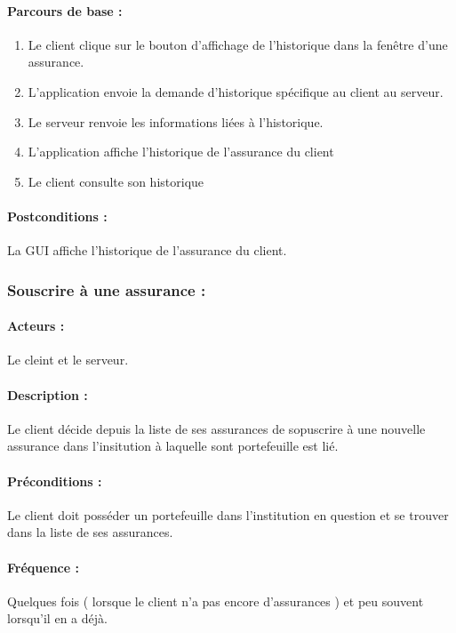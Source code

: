 \documentclass[../annexe.tex]{subfiles}
\begin{document}
\paragraph{Parcours de base :} 

	\begin{enumerate}
		\item Le client clique sur le bouton d'affichage de l'historique dans la fenêtre d'une assurance.
		\item L'application envoie la demande d'historique spécifique au client au serveur.
		\item Le serveur renvoie les informations liées à l'historique.
		\item L'application affiche l'historique de l'assurance du client
		\item Le client consulte son historique 
	\end{enumerate}

\paragraph{Postconditions :} La GUI affiche l'historique de l'assurance du client.

\newpage

\subsubsection{Souscrire à une assurance :}

\paragraph{Acteurs :}

		Le cleint et le serveur.

\paragraph{Description :}
		
		Le client décide depuis la liste de ses assurances de sopuscrire à une nouvelle assurance dans l'insitution à laquelle sont portefeuille est lié.

\paragraph{Préconditions :}
		Le client doit posséder un portefeuille dans l'institution en question et se trouver dans la liste de ses assurances.
\paragraph{Fréquence :}
		Quelques fois ( lorsque le client n'a pas encore d'assurances ) et peu souvent lorsqu'il en a déjà.
\end{document}
